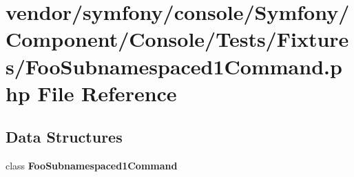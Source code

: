 \section{vendor/symfony/console/\+Symfony/\+Component/\+Console/\+Tests/\+Fixtures/\+Foo\+Subnamespaced1\+Command.php File Reference}
\label{_foo_subnamespaced1_command_8php}
\subsection*{Data Structures}
\begin{DoxyCompactItemize}
\item 
class {\bf Foo\+Subnamespaced1\+Command}
\end{DoxyCompactItemize}
